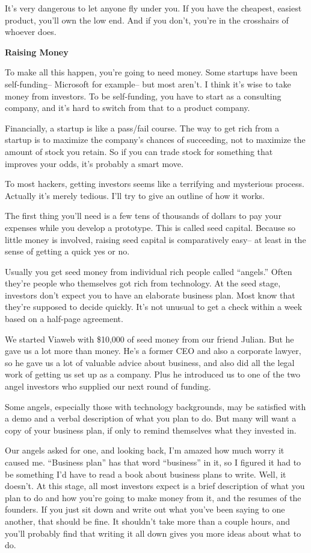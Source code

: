 \documentclass[12pt]{book}
\begin{document}
It's very dangerous to let anyone fly under you. If you have the
cheapest, easiest product, you'll own the low end. And if you don't,
you're in the crosshairs of whoever does.

\textbf{Raising Money}

To make all this happen, you're going to need money. Some startups have
been self-funding-- Microsoft for example-- but most aren't. I think
it's wise to take money from investors. To be self-funding, you have to
start as a consulting company, and it's hard to switch from that to a
product company.

Financially, a startup is like a pass/fail course. The way to get rich
from a startup is to maximize the company's chances of succeeding, not
to maximize the amount of stock you retain. So if you can trade stock
for something that improves your odds, it's probably a smart move.

To most hackers, getting investors seems like a terrifying and
mysterious process. Actually it's merely tedious. I'll try to give an
outline of how it works.

The first thing you'll need is a few tens of thousands of dollars to pay
your expenses while you develop a prototype. This is called seed
capital. Because so little money is involved, raising seed capital is
comparatively easy-- at least in the sense of getting a quick yes or no.

Usually you get seed money from individual rich people called
``angels.'' Often they're people who themselves got rich from
technology. At the seed stage, investors don't expect you to have an
elaborate business plan. Most know that they're supposed to decide
quickly. It's not unusual to get a check within a week based on a
half-page agreement.

We started Viaweb with \$10,000 of seed money from our friend Julian.
But he gave us a lot more than money. He's a former CEO and also a
corporate lawyer, so he gave us a lot of valuable advice about business,
and also did all the legal work of getting us set up as a company. Plus
he introduced us to one of the two angel investors who supplied our next
round of funding.

Some angels, especially those with technology backgrounds, may be
satisfied with a demo and a verbal description of what you plan to do.
But many will want a copy of your business plan, if only to remind
themselves what they invested in.

Our angels asked for one, and looking back, I'm amazed how much worry it
caused me. ``Business plan'' has that word ``business'' in it, so I
figured it had to be something I'd have to read a book about business
plans to write. Well, it doesn't. At this stage, all most investors
expect is a brief description of what you plan to do and how you're
going to make money from it, and the resumes of the founders. If you
just sit down and write out what you've been saying to one another, that
should be fine. It shouldn't take more than a couple hours, and you'll
probably find that writing it all down gives you more ideas about what
to do.
\end{document}
